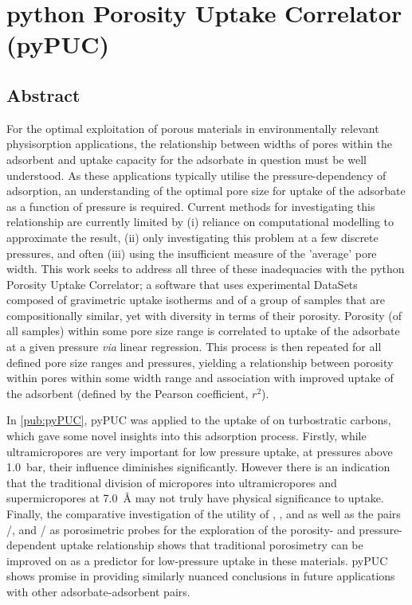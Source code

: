 \chapter{python Porosity Uptake Correlator (pyPUC)}
\label{ch:pyPUC}

\newpage
\section*{Abstract}
For the optimal exploitation of porous materials in environmentally relevant physisorption applications, the relationship between widths of pores within the \gls{adsorbent} and uptake capacity for the \gls{adsorbate} in question must be well understood. As these applications typically utilise the pressure-dependency of \gls{adsorption}, an understanding of the optimal pore size for uptake of the \gls{adsorbate} as a function of pressure is required. Current methods for investigating this relationship are currently limited by (i) reliance on computational modelling to approximate the result, (ii) only investigating this problem at a few discrete pressures, and often (iii) using the insufficient measure of the 'average' pore width. This work seeks to address all three of these inadequacies with the python Porosity Uptake Correlator; a software that uses experimental DataSets composed of gravimetric uptake isotherms and  of a group of samples that are compositionally similar, yet with diversity in terms of their porosity. Porosity (of all samples) within some pore size range is correlated to uptake of the \gls{adsorbate} at a given pressure \textit{via} linear regression. This process is then repeated for all defined pore size ranges and pressures, yielding a relationship between porosity within pores within some width range and association with improved uptake of the \gls{adsorbent} (defined by the Pearson coefficient, $r^2$).

In \ref{pub:pyPUC}, pyPUC was applied to the uptake of  on \glspl{turbostratic carbon}, which gave some novel insights into this \gls{adsorption} process. Firstly, while \glspl{ultramicropore} are very important for low pressure  uptake, at pressures above \qty{1.0}{\bar}, their influence diminishes significantly. However there is an indication that the traditional division of \glspl{micropore} into \glspl{ultramicropore} and \glspl{supermicropore} at \qty{7.0}{\angstrom} may not truly have physical significance to  uptake. Finally, the comparative investigation of the utility of , , and  as well as the pairs /, and / as porosimetric probes for the exploration of the porosity- and pressure-dependent  uptake relationship shows that traditional  porosimetry can be improved on as a predictor for low-pressure  uptake in these materials. pyPUC shows promise in providing similarly nuanced conclusions in future applications with other \gls{adsorbate}-\gls{adsorbent} pairs.

